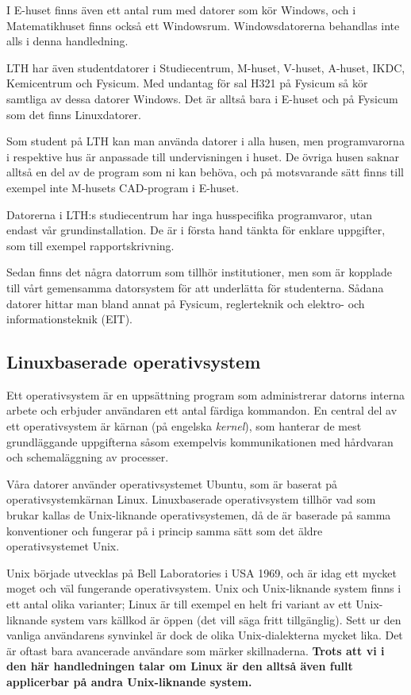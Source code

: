 \documentclass[a4paper,twocolumn]{book}
\begin{document}
I E-huset finns även ett antal rum med datorer som kör Windows, och i
Matematikhuset finns också ett Windowsrum.
Windowsdatorerna behandlas inte alls i denna handledning.

LTH har även studentdatorer i Studiecentrum, M-huset, V-huset, A-huset, IKDC,
Kemicentrum och Fysicum. Med undantag för sal H321 på Fysicum
så kör samtliga av dessa datorer Windows. Det är alltså bara i E-huset och
på Fysicum som det finns Linuxdatorer.

Som student på LTH kan man använda datorer i alla husen, men programvarorna i
respektive hus är anpassade till undervisningen i huset. De övriga husen
saknar alltså en del av de program som ni kan behöva, och på motsvarande sätt
finns till exempel inte M-husets CAD-program i E-huset.

Datorerna i LTH:s studiecentrum har inga husspecifika programvaror, utan
endast vår grundinstallation. De är i första hand tänkta för enklare
uppgifter, som till exempel rapportskrivning.

Sedan finns det några datorrum som tillhör institutioner, men som är kopplade
till vårt gemensamma datorsystem för att underlätta för studenterna. Sådana
datorer hittar man bland annat på Fysicum, reglerteknik och elektro- och
informationsteknik (EIT).

\subsection{Linuxbaserade operativsystem}

Ett operativsystem är en uppsättning program som administrerar datorns
interna arbete och erbjuder användaren ett antal färdiga kommandon. En central
del av ett operativsystem är kärnan (på engelska \emph{kernel}), som hanterar
de mest grundläggande uppgifterna såsom exempelvis kommunikationen med hårdvaran
och schemaläggning av processer.

Våra datorer använder operativsystemet Ubuntu, som är baserat på
operativsystemkärnan Linux. Linuxbaserade operativsystem tillhör vad som brukar
kallas de Unix-liknande operativsystemen, då de är baserade på samma konventioner
och fungerar på i princip samma sätt som det äldre operativsystemet Unix.

Unix började utvecklas på Bell Laboratories i USA 1969, och är idag ett
mycket moget och väl fungerande operativsystem. Unix och Unix-liknande system finns
i ett antal olika varianter; Linux är till exempel en helt fri variant av
ett Unix-liknande system vars källkod är öppen (det vill säga fritt tillgänglig).
Sett ur den vanliga användarens synvinkel är
dock de olika Unix-dialekterna mycket lika. Det är oftast bara avancerade
användare som märker skillnaderna. \textbf{Trots att vi i den här handledningen talar
  om Linux är den alltså även fullt applicerbar på andra Unix-liknande system.}
\end{document}
